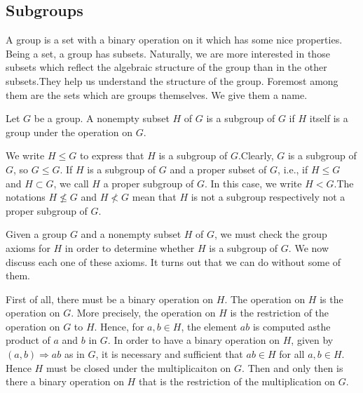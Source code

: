 \documentclass[11pt]{amsbook}
\begin{document}




	\begin{center}
		\section{Subgroups}
	\end{center}

	\begin{par}
		\noindent A group is a set with a binary operation on it which has some nice properties. Being a set, a group has subsets. Naturally, we are more 
		interested in those subsets which reflect the algebraic structure of the group than in the other subsets.They help us understand the structure
		of the group. Foremost among them are the sets which are groups themselves. We give them a name.
	\end{par}

		\hspace{1pt}

	\begin{defn}
		Let $G$ be a group. A nonempty subset $H$ of  $G$ is a subgroup of  $G$ if  $H$ itself is a group under the operation on $G$.
	\end{defn}

	\hspace{1pt}
	
	\begin{par}
		\noindent We write $H\leq G$ to express that $H$ is a subgroup of $G$.Clearly, $G$ is a subgroup of $G$, so $G \leq G$. If $H$ is a subgroup of $G$ and a proper 		    		
		subset of $G$, i.e., if $H \leq G$ and $H \subset G$, we call $H$ a proper subgroup of $G$.  In this case, we write $H < G$.The notations $H \nleq G$ and 
		$H \nless G$ mean that $H$ is not a subgroup respectively not a proper subgroup of $G$.
	\end{par}
	
	\hspace{1pt}
	
	\begin{par}
		\noindent Given a group $G$ and a nonempty subset $H$ of $G$, we must check the group axioms for $H$ in order to determine whether $H$ is a subgroup of $G$. We now discuss each one of these axioms. It turns out that we can do without some of them.
	\end{par}
	
	\hspace{1pt}
	
	\begin{par}
		\noindent First of all, there must be a binary operation on $H$. The operation on $H$ is the operation on $G$. More precisely, the operation on $H$ is the restriction of the operation on $G$ to $H$. 
		Hence, for $a,b \in H$, the element $ab$ is computed asthe product of $a$ and $b$ in $G$. 
		In order to have a binary operation on $H$, given by $ (a,b) \Rightarrow ab $ as in $G$, it is necessary and sufficient that $ab \in H$ for all $a,b \in H $. Hence
		$H$ must be closed under the multiplicaiton on $G$. Then and only then is there a binary operation on $H$ that is the restriction of the multiplication on $G$.
	\end{par}
\end{document}
